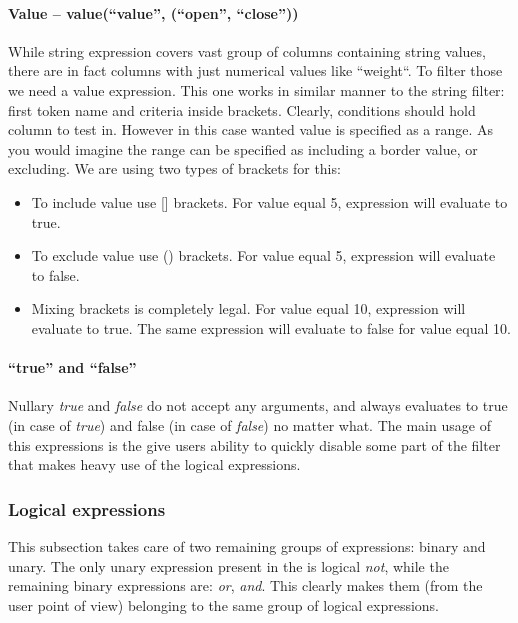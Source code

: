 \paragraph{Value -- value(``value'', (``open'', ``close''))}
While string expression covers vast group of columns containing string values, there are in fact columns with just numerical values like
``weight``. To filter those we need a value expression. This one works in similar manner to the string filter: first token name and criteria
inside brackets. Clearly, conditions should hold column to test in. However in this case wanted value is specified as a range.
As you would imagine the range can be specified as including a border value, or excluding. We are using two types of brackets for this:
\begin{itemize}
 \item To include value use [] brackets. For value equal 5, expression  will evaluate to true.
 \item To exclude value use () brackets. For value equal 5, expression  will evaluate to false.
 \item Mixing brackets is completely legal. For value equal 10, expression \mono{value(something, [5, 10)} will evaluate to true.
 The same expression will evaluate to false for value equal 10.
\end{itemize}

\paragraph{``true'' and ``false''}
Nullary \textit{true} and \textit{false} do not accept any arguments, and always evaluates to true (in case of \textit{true})
and false (in case of \textit{false})  no matter what. The main usage of this expressions is the give users ability to quickly
disable some part of the filter that makes heavy use of the logical expressions.

\subsubsection{Logical expressions}
This subsection takes care of two remaining groups of expressions: binary and unary. The only unary expression present in the \OCS{} is logical
\textit{not}, while the remaining binary expressions are: \textit{or}, \textit{and}. This clearly makes them (from the user point of view)
belonging to the same group of logical expressions.

